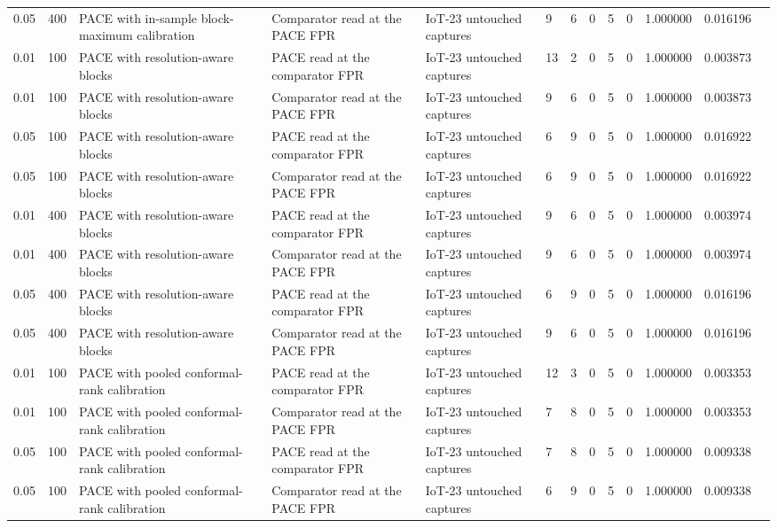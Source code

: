 \begin{tabular}{lllllllllllll}
0.05 & 400 & PACE with in-sample block-maximum calibration & Comparator read at the PACE FPR & IoT-23 untouched captures & 9 & 6 & 0 & 5 & 0 & 1.000000 & 0.016196 &  \\
0.01 & 100 & PACE with resolution-aware blocks & PACE read at the comparator FPR & IoT-23 untouched captures & 13 & 2 & 0 & 5 & 0 & 1.000000 & 0.003873 &  \\
0.01 & 100 & PACE with resolution-aware blocks & Comparator read at the PACE FPR & IoT-23 untouched captures & 9 & 6 & 0 & 5 & 0 & 1.000000 & 0.003873 &  \\
0.05 & 100 & PACE with resolution-aware blocks & PACE read at the comparator FPR & IoT-23 untouched captures & 6 & 9 & 0 & 5 & 0 & 1.000000 & 0.016922 &  \\
0.05 & 100 & PACE with resolution-aware blocks & Comparator read at the PACE FPR & IoT-23 untouched captures & 6 & 9 & 0 & 5 & 0 & 1.000000 & 0.016922 &  \\
0.01 & 400 & PACE with resolution-aware blocks & PACE read at the comparator FPR & IoT-23 untouched captures & 9 & 6 & 0 & 5 & 0 & 1.000000 & 0.003974 &  \\
0.01 & 400 & PACE with resolution-aware blocks & Comparator read at the PACE FPR & IoT-23 untouched captures & 9 & 6 & 0 & 5 & 0 & 1.000000 & 0.003974 &  \\
0.05 & 400 & PACE with resolution-aware blocks & PACE read at the comparator FPR & IoT-23 untouched captures & 6 & 9 & 0 & 5 & 0 & 1.000000 & 0.016196 &  \\
0.05 & 400 & PACE with resolution-aware blocks & Comparator read at the PACE FPR & IoT-23 untouched captures & 9 & 6 & 0 & 5 & 0 & 1.000000 & 0.016196 &  \\
0.01 & 100 & PACE with pooled conformal-rank calibration & PACE read at the comparator FPR & IoT-23 untouched captures & 12 & 3 & 0 & 5 & 0 & 1.000000 & 0.003353 &  \\
0.01 & 100 & PACE with pooled conformal-rank calibration & Comparator read at the PACE FPR & IoT-23 untouched captures & 7 & 8 & 0 & 5 & 0 & 1.000000 & 0.003353 &  \\
0.05 & 100 & PACE with pooled conformal-rank calibration & PACE read at the comparator FPR & IoT-23 untouched captures & 7 & 8 & 0 & 5 & 0 & 1.000000 & 0.009338 &  \\
0.05 & 100 & PACE with pooled conformal-rank calibration & Comparator read at the PACE FPR & IoT-23 untouched captures & 6 & 9 & 0 & 5 & 0 & 1.000000 & 0.009338 &  \\

\end{tabular}
